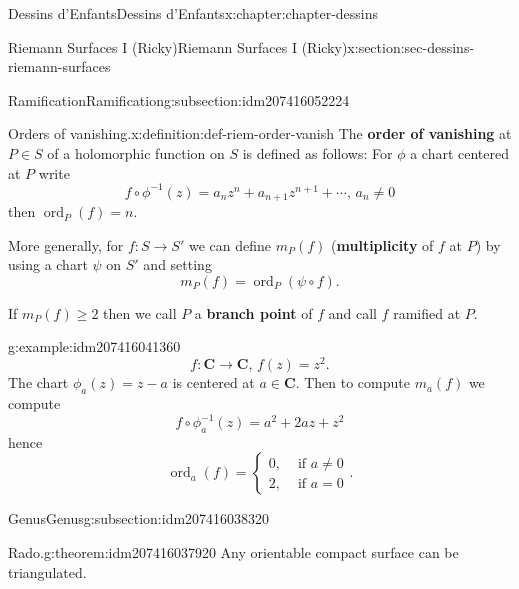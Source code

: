 \documentclass[oneside,10pt,]{book}
\newcommand{\terminology}[1]{\textbf{#1}}
\numberwithin{equation}{section}
\newcommand{\inv}{^{-1}}
\newcommand{\CC}{\mathbf{C}}
\DeclareMathOperator{\ord}{ord}
\newcommand{\amp}{&}
\begin{document}
\begin{chapterptx}{Dessins d'Enfants}{}{Dessins d'Enfants}{}{}{x:chapter:chapter-dessins}
\begin{sectionptx}{Riemann Surfaces I (Ricky)}{}{Riemann Surfaces I (Ricky)}{}{}{x:section:sec-dessins-riemann-surfaces}
\typeout{************************************************}
%
\begin{subsectionptx}{Ramification}{}{Ramification}{}{}{g:subsection:idm207416052224}
\begin{definition}{Orders of vanishing.}{x:definition:def-riem-order-vanish}%
The \terminology{order of vanishing} at \(P\in S\) of a holomorphic function on \(S\) is defined as follows: For \(\phi\) a  chart centered at \(P\) write%
\begin{equation*}
f\circ \phi\inv (z) = a_n z^n + a_{n+1}z^{n+1} + \cdots,\,a_n\ne 0
\end{equation*}
then \(\ord_P(f) = n\).%
\par
More generally, for \(f\colon S \to S'\) we can define \(m_P(f)\) (\terminology{multiplicity} of \(f\) at \(P\)) by using a chart \(\psi\) on \(S'\) and setting%
\begin{equation*}
m_P(f) = \ord_P(\psi\circ f)\text{.}
\end{equation*}
%
\par
If \(m_P(f)\ge 2\) then we call \(P\) a \terminology{branch point} of \(f\) and call \(f\) ramified at \(P\).%
\end{definition}
\begin{example}{}{g:example:idm207416041360}%
%
\begin{equation*}
f\colon \CC \to \CC,\,f(z) = z^2\text{.}
\end{equation*}
The chart \(\phi_a(z) = z-a\) is centered at \(a \in \CC\). Then to compute \(m_a(f)\) we compute%
\begin{equation*}
f\circ \phi\inv_a(z) = a^2 + 2az + z^2
\end{equation*}
hence%
\begin{equation*}
\ord_a(f) =\begin{cases} 0,\amp \text{ if } a\ne 0\\ 2,\amp\text{ if } a= 0\end{cases}\text{.}
\end{equation*}
%
\end{example}
\end{subsectionptx}
%
%
\typeout{************************************************}
\typeout{************************************************}
%
\begin{subsectionptx}{Genus}{}{Genus}{}{}{g:subsection:idm207416038320}
\begin{theorem}{Rado.}{}{g:theorem:idm207416037920}%
Any orientable compact surface can be triangulated.%

\end{theorem}
\end{subsectionptx}
\end{sectionptx}
\end{chapterptx}
\end{document}
